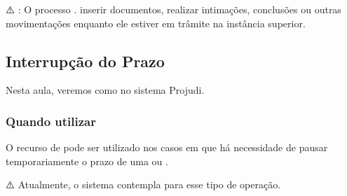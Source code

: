 \documentclass[letterpaper,10pt,brazil]{sphinxmanual}
\begin{document}
\sphinxAtStartPar
⚠️ :
\sphinxhyphen{} O processo .
\sphinxhyphen{}  inserir documentos, realizar intimações, conclusões ou outras movimentações enquanto ele estiver em trâmite na instância superior.

\sphinxstepscope


\subsection{Interrupção do Prazo}
\label{\detokenize{projud_38_interrupcaoprazo:interrupcao-do-prazo}}\label{\detokenize{projud_38_interrupcaoprazo::doc}}
\sphinxAtStartPar
Nesta aula, veremos como  no sistema Projudi.


\subsubsection{Quando utilizar}
\label{\detokenize{projud_38_interrupcaoprazo:quando-utilizar}}
\sphinxAtStartPar
O recurso de  pode ser utilizado nos casos em que há necessidade de pausar temporariamente o prazo de uma  ou .

\sphinxAtStartPar
⚠️ Atualmente, o sistema contempla  para esse tipo de operação.
\end{document}
